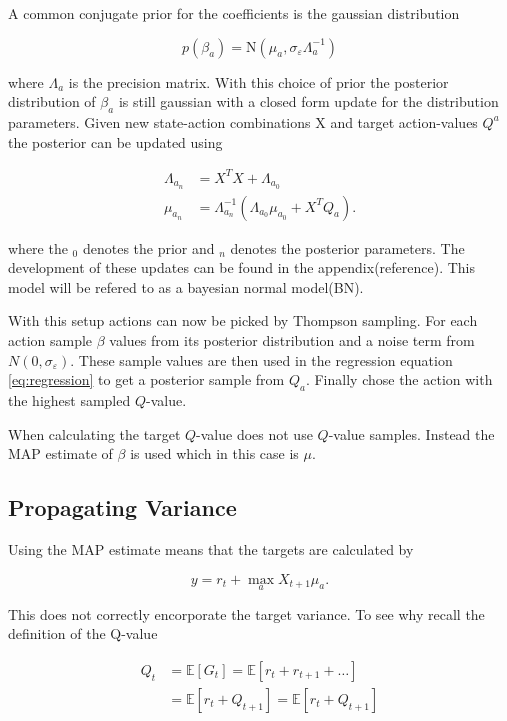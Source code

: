 A common conjugate prior for the coefficients is the gaussian distribution 

$$
p(\beta_a) = \text{N}(\mu_a, \sigma_\varepsilon\Lambda_a^{-1}) 
$$

where $\Lambda_a$ is the precision matrix. With this choice of prior the posterior distribution of $\beta_a$ is still gaussian with a closed form update for the distribution parameters. Given new state-action combinations X and target action-values $Q^a$ the posterior can be updated using 

\begin{equation}
    \begin{split}
        \label{eq:known_noise_posterior_update}
        \Lambda_{a_n} & = X^TX + \Lambda_{a_0} \\
        \mu_{a_n}     & = \Lambda_{a_n}^{-1}(\Lambda_{a_0}\mu_{a_0} + X^TQ_a).
    \end{split}
\end{equation}

where the $_0$ denotes the prior and $_n$ denotes the posterior parameters. The development of these updates can be found in the appendix(\todo reference). This model will be refered to as a bayesian normal model(BN).

With this setup actions can now be picked by Thompson sampling. For each action sample $\beta$ values from its posterior distribution and a noise term from $N(0, \sigma_\varepsilon)$. These sample values are then used in the regression equation \ref{eq:regression} to get a posterior sample from $Q_a$. Finally chose the action with the highest sampled $Q$-value. 

When calculating the target $Q$-value \cite{azziz_2018} does not use $Q$-value samples. Instead the MAP estimate of $\beta$ is used which in this case is $\mu$.


\subsection{Propagating Variance}

Using the MAP estimate means that the targets are calculated by 

$$
y = r_t + \max_a X_{t+1}\mu_a.
$$

This does not correctly encorporate the target variance. To see why recall the definition of the Q-value

\begin{align*}
    Q_t &= \mathbb{E}[G_t] = \mathbb{E}[r_t + r_{t+1} + \dots] \\
    &= \mathbb{E}[r_t + Q_{t+1}] = \mathbb{E}[r_t + Q_{t+1}]
\end{align*}

